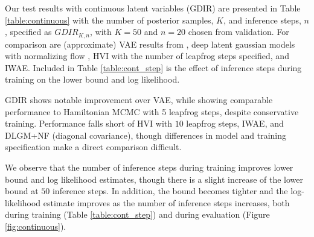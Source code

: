 \documentclass{article} %
\begin{document}
Our test results with continuous latent variables (GDIR) are presented in Table
\ref{table:continuous} with the number of posterior samples, $K$, and inference
steps, $n$, specified as $GDIR_{K, n}$, with $K=50$ and $n=20$ chosen from
validation. For comparison are (approximate) VAE results from
\citep{kingma2013auto}, deep latent gaussian models with normalizing flow
\citep[DLGM+NF,][]{rezende2015variational}, HVI with the number of leapfrog steps
specified, and IWAE. Included in Table \ref{table:cont_step} is
the effect of inference steps during training on the lower bound and log
likelihood.

GDIR shows notable improvement over VAE, while showing comparable performance to
Hamiltonian MCMC with 5 leapfrog steps, despite conservative training.
Performance falls short of HVI with $10$ leapfrog steps, IWAE, and DLGM+NF (diagonal covariance),
though differences in model and training specification make a direct comparison difficult.

We observe that the number of inference steps during training improves lower
bound and log likelihood estimates, though there is a slight increase of the lower bound at $50$ inference steps. In addition, the bound becomes tighter and the log-likelihood estimate improves as the number of inference steps increases, both during training (Table \ref{table:cont_step}) and during evaluation (Figure \ref{fig:continuous}).
\end{document}
